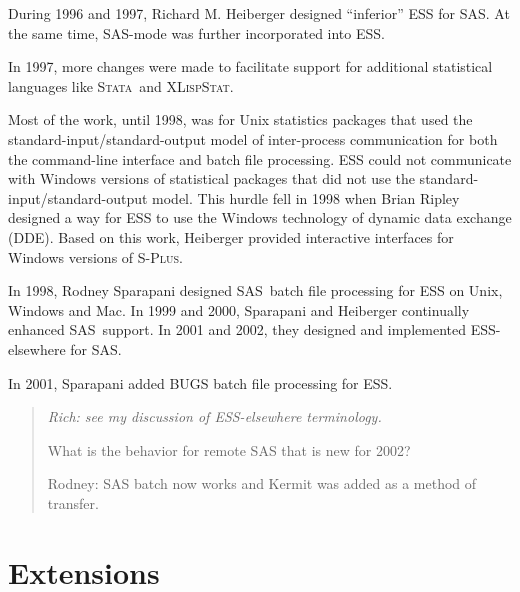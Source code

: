 \documentclass{article}
\newcommand*{\SAS}{\textsc{SAS}}
\newcommand*{\Splus}{\textsc{S-Plus}}
\newcommand*{\XLispStat}{\textsc{XLispStat}}
\newcommand*{\Stata}{\textsc{Stata}}
\newenvironment{Comment}{\begin{quote}\small\itshape }{\end{quote}}
\begin{document}
During 1996 and 1997, Richard M. Heiberger designed ``inferior'' ESS for \SAS.
At the same time, SAS-mode was further incorporated into ESS.

In 1997, more changes were made to facilitate
support for additional statistical languages like \Stata\ and \XLispStat.

Most of the work, until 1998, was for Unix statistics
packages that used the standard-input/standard-output model of inter-process
communication for both the command-line interface and batch file
processing.  ESS could not communicate
with Windows versions of statistical packages that did not
use the standard-input/standard-output model.  This hurdle
fell in 1998 when Brian Ripley designed a way for ESS to use
the Windows technology of dynamic data exchange (DDE).
Based on this work, Heiberger provided interactive interfaces
for Windows versions of \Splus.

In 1998, Rodney Sparapani designed \SAS\ batch file processing for ESS
on Unix, Windows and Mac.  In 1999 and 2000, Sparapani and Heiberger
continually enhanced \SAS\ support. 
In 2001 and 2002, they designed and implemented ESS-elsewhere for \SAS.  

In 2001, Sparapani added BUGS batch file processing for ESS.



\begin{Comment}
Rich: see my discussion of ESS-elsewhere terminology.

What is the behavior for remote SAS that is new for 2002?

Rodney: SAS batch now works and Kermit was added as a method of transfer.
\end{Comment}


\section{Extensions}
\label{sec:extensions}
\end{document}
